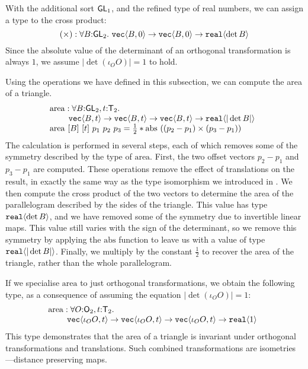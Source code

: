 With the additional sort $\mathsf{GL}_1$, and the refined type of real
numbers, we can assign a type to the cross product:
\begin{displaymath}
  (\times) : \forall B \mathord: \SynGL{2}.\ \tyPrim{vec}{B,0} \to \tyPrim{vec}{B,0} \to \tyPrim{real}{\det B}
\end{displaymath}
Since the absolute value of the determinant of an orthogonal
transformation is always $1$, we assume $|\det (\iota_O O)| = 1$ to
hold.

\begin{example}\label{ex:area-of-triangle-1}
  Using the operations we have defined in this subsection, we can
  compute the area of a triangle. 
  \begin{displaymath}
    \begin{array}{@{}l}
      \mathrm{area} : \forall B\mathord:\SynGL{2}, t\mathord:\SynTransl{2}.\ \\
      \hspace{0.8cm}\tyPrim{vec}{B, t} \to \tyPrim{vec}{B, t} \to \tyPrim{vec}{B, t} \to \tyPrim{real}{|\det B|} \\
      \mathrm{area}\ [B]\ [t]\ p_1\ p_2\ p_3 = \frac{1}{2} * \mathrm{abs}\ ((p_2 - p_1) \times (p_3 - p_1))
    \end{array}
  \end{displaymath}
  The calculation is performed in several steps, each of which removes
  some of the symmetry described by the type of
  $\mathrm{area}$. First, the two offset vectors $p_2 - p_1$ and $p_3
  - p_1$ are computed. These operations remove the effect of
  translations on the result, in exactly the same way as the type
  isomorphism we introduced in . We then compute
  the cross product of the two vectors to determine the area of the
  parallelogram described by the sides of the triangle. This value has
  type $\texttt{real}\langle \det B \rangle$, and we have removed some of the
  symmetry due to invertible linear maps. This value still varies with
  the sign of the determinant, so we remove this symmetry by applying
  the $\mathrm{abs}$ function to leave us with a value of type
  $\texttt{real}\langle |\det B| \rangle$. Finally, we multiply by the constant
  $\frac{1}{2}$ to recover the area of the triangle, rather than the
  whole parallelogram.

  If we specialise $\mathrm{area}$ to just orthogonal transformations,
  we obtain the following type, as a consequence of assuming the
  equation $|\det (\iota_OO)| = 1$:
  \begin{displaymath}
    \begin{array}{@{}l}
      \mathrm{area} : \forall O\mathord:\SynOrth{2}, t\mathord:\SynTransl{2}.\ \\
      \hspace{0.8cm}\tyPrim{vec}{\iota_OO, t} \to \tyPrim{vec}{\iota_OO, t} \to \tyPrim{vec}{\iota_OO, t} \to \tyPrim{real}{1}
    \end{array}
  \end{displaymath}
  This type demonstrates that the area of a triangle is invariant
  under orthogonal transformations and translations. Such combined
  transformations are isometries---distance preserving maps.
\end{example}

